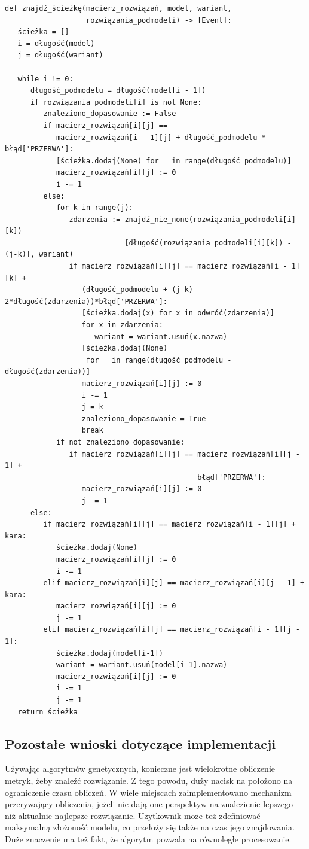 \lstset{caption=Znajdowanie ścieżki w modelu, captionpos=b}
\lstset{label=src:traceback, frame=single}
\begin{lstlisting}[escapeinside=``]
def znajdź_ścieżkę(macierz_rozwiązań, model, wariant, 
                   rozwiązania_podmodeli) -> [Event]:
   ścieżka = []
   i = długość(model)
   j = długość(wariant) 
    
   while i != 0:
      długość_podmodelu = długość(model[i - 1])
      if rozwiązania_podmodeli[i] is not None:
         znaleziono_dopasowanie := False
         if macierz_rozwiązań[i][j] == 
            macierz_rozwiązań[i - 1][j] + długość_podmodelu * błąd['PRZERWA']:
            [ścieżka.dodaj(None) for _ in range(długość_podmodelu)]
            macierz_rozwiązań[i][j] := 0
            i -= 1
         else:
            for k in range(j):
               zdarzenia := znajdź_nie_none(rozwiązania_podmodeli[i][k])
                            [długość(rozwiązania_podmodeli[i][k]) - (j-k)], wariant)
               if macierz_rozwiązań[i][j] == macierz_rozwiązań[i - 1][k] + 
                  (długość_podmodelu + (j-k) - 2*długość(zdarzenia))*błąd['PRZERWA']:
                  [ścieżka.dodaj(x) for x in odwróć(zdarzenia)]
                  for x in zdarzenia:
                     wariant = wariant.usuń(x.nazwa)
                  [ścieżka.dodaj(None) 
                   for _ in range(długość_podmodelu - długość(zdarzenia))]
                  macierz_rozwiązań[i][j] := 0
                  i -= 1
                  j = k
                  znaleziono_dopasowanie = True
                  break
            if not znaleziono_dopasowanie:
               if macierz_rozwiązań[i][j] == macierz_rozwiązań[i][j - 1] + 
                                             błąd['PRZERWA']:
                  macierz_rozwiązań[i][j] := 0
                  j -= 1
      else:
         if macierz_rozwiązań[i][j] == macierz_rozwiązań[i - 1][j] + kara:
            ścieżka.dodaj(None)
            macierz_rozwiązań[i][j] := 0
            i -= 1
         elif macierz_rozwiązań[i][j] == macierz_rozwiązań[i][j - 1] + kara:
            macierz_rozwiązań[i][j] := 0
            j -= 1
         elif macierz_rozwiązań[i][j] == macierz_rozwiązań[i - 1][j - 1]:
            ścieżka.dodaj(model[i-1])
            wariant = wariant.usuń(model[i-1].nazwa)
            macierz_rozwiązań[i][j] := 0
            i -= 1 
            j -= 1
   return ścieżka
\end{lstlisting}

\subsection{Pozostałe wnioski dotyczące implementacji}
Używając algorytmów genetycznych, konieczne jest wielokrotne obliczenie metryk, żeby znaleźć rozwiązanie. Z tego powodu, duży nacisk na położono na ograniczenie czasu obliczeń. W wiele miejscach zaimplementowano mechanizm przerywający obliczenia, jeżeli nie dają one perspektyw na znalezienie lepszego niż aktualnie najlepsze rozwiązanie. Użytkownik może też zdefiniować maksymalną złożoność modelu, co przełoży się także na czas jego znajdowania. Duże znaczenie ma też fakt, że algorytm pozwala na równoległe procesowanie. 

